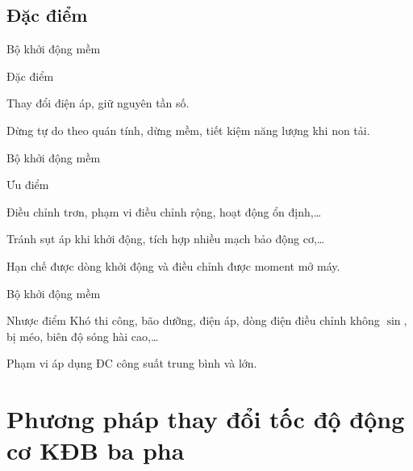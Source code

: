 \documentclass[20pt]{beamer}
\begin{document}
\subsection*{Đặc điểm}
\begin{frame}{Bộ khởi động mềm}
	\begin{block}{Đặc điểm}
		\begin{list}{--}{}
			\justifying
			\item Thay đổi điện áp, giữ nguyên tần số. 
			\item Dừng tự do theo quán tính, dừng mềm, tiết kiệm năng lượng khi non tải.
		\end{list}
	\end{block}
\end{frame}

\begin{frame}{Bộ khởi động mềm}
	\begin{block}{Ưu điểm}
		\begin{list}{--}{}
			\justifying
			\item Điều chỉnh trơn, phạm vi điều chỉnh rộng, hoạt động ổn định,\ldots
			\item Tránh sụt áp khi khởi động, tích hợp nhiều mạch bảo động cơ,\ldots
			\item Hạn chế được dòng khởi động và điều chỉnh được moment mở máy.
		\end{list}
	\end{block}
\end{frame}

\begin{frame}{Bộ khởi động mềm}
	\justifying	
	\begin{block}{Nhược điểm}
		Khó thi công, bão dưỡng, điện áp, dòng điện điều chỉnh không $\sin$, bị méo, biên độ sóng hài cao,\ldots
	\end{block}
	\begin{block}{Phạm vi áp dụng}
		ĐC công suất trung bình và lớn.
	\end{block}
\end{frame}


\section[Thay đổi tốc độ động cơ KĐB ba pha]{Phương pháp thay đổi tốc độ động cơ KĐB ba pha}
\end{document}
